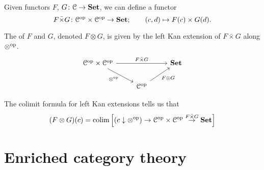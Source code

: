\documentclass[main.tex]{subfiles}
\begin{document}
Given functors $F$, $G\colon \mathcal{C} \to \mathbf{Set}$, we can define a functor
\begin{equation*}
  F \bar{\times} G\colon \mathcal{C}^{\mathrm{op}} \times \mathcal{C}^{\mathrm{op}} \to \mathbf{Set};\qquad (c, d) \mapsto F(c) \times G(d).
\end{equation*}

\begin{definition}
  \label{def:day_convolution}
  The  of $F$ and $G$, denoted $F \otimes G$, is given by the left Kan extension of $F \bar{\times} G$ along $\otimes^{\mathrm{op}}$.
  \begin{equation*}
    \begin{tikzcd}
      \mathcal{C}\op \times \mathcal{C}\op
      \arrow[rr, "F \bar{\times} G"]
      \arrow[dr, swap, "\otimes\op"]
      && \Set
      \\
      & \mathcal{C}\op
      \arrow[ur, swap, "F \otimes G"]
    \end{tikzcd}
  \end{equation*}
\end{definition}

The colimit formula for left Kan extensions tells us that
\begin{equation*}
  (F \otimes G)(c) = \operatorname*{colim} \left[ (c \downarrow \otimes^{\mathrm{op}}) \to \mathcal{C}^{\mathrm{op}} \times \mathcal{C}^{\mathrm{op}} \overset{F \bar{\times} G}{\to} \mathbf{Set} \right]
\end{equation*}

\section{Enriched category theory}
\label{sec:enriched_category_theory}
\end{document}

